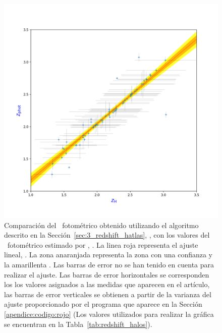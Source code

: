\begin{figure}[h]
    \begin{center}
         \includegraphics[width=16cm]{3_Redshift_Hatlas/comparacion_Z.png}
    \end{center}
    \vspace*{-15mm}
    \caption{\small Comparación del \rt\ fotométrico obtenido utilizando el algoritmo descrito en la Sección~\ref{sec:3_redshift_hatlas}, , con los valores del \rt\ fotométrico estimado por \cite{article:Nuevo_2012}, . La linea roja representa el ajuste lineal, . La zona anaranjada representa la zona con una confianza  y la amarillenta . Las barras de error no se han tenido en cuenta para realizar el ajuste. Las barras de error horizontales se corresponden los los valores asignados a las medidas que aparecen en el artículo, las barras de error verticales se obtienen a partir de la varianza del ajuste proporcionado por el programa que aparece en la Sección \ref{apendice:codigo:rojo} (Los valores utilizados para realizar la gráfica se encuentran en la Tabla~\ref{tab:redshift_halos}).} 
    \label{fig:comparacion_sed}
\end{figure}

